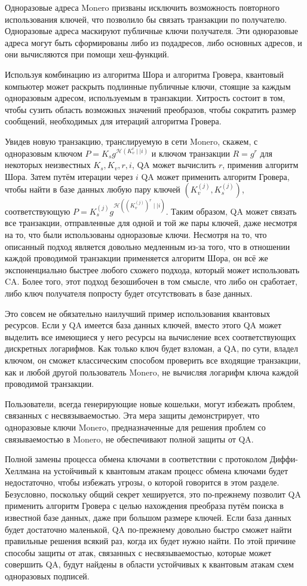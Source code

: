 \documentclass{mrl}
\begin{document}
Одноразовые адреса Monero призваны исключить возможность повторного использования ключей, что позволило бы связать транзакции по получателю. Одноразовые адреса маскируют публичные ключи получателя. Эти одноразовые адреса могут быть сформированы либо из подадресов, либо основных адресов, и они вычисляются при помощи хеш-функций.

Используя комбинацию из алгоритма Шора и алгоритма Гровера, квантовый компьютер может раскрыть подлинные публичные ключи, стоящие за каждым одноразовым адресом, используемым в транзакции. Хитрость состоит в том, чтобы сузить область возможных значений преобразов, чтобы сократить размер сообщений, необходимых для итераций алгоритма Гровера. 

Увидев новую транзакцию, транслируемую в сети Monero, скажем, с одноразовым ключом $P = K_s g^{\mathcal{H}(K_v^r \mid \mid i)}$ и ключом транзакции $R = g^r$ для некоторых неизвестных $K_s, K_v, r, i$, QA может вычислить $r$, применив алгоритм Шора. Затем путём итерации через $i$ QA может применить алгоритм Гровера, чтобы найти в базе данных любую пару ключей $(K_v^{(j)}, K_s^{(j)})$, соответствующую $P = K_s^{(j)} g^{\mathcal{H}((K_v^{(j)})^r \mid \mid i)}$. Таким образом, QA может связать все транзакции, отправленные для одной и той же пары ключей, даже несмотря на то, что были использованы одноразовые ключи. Несмотря на то, что описанный подход является довольно медленным из-за того, что в отношении каждой проводимой транзакции применяется алгоритм Шора, он всё же экспоненциально быстрее любого схожего подхода, который может использовать CA. Более того, этот подход безошибочен в том смысле, что либо он сработает, либо ключ получателя попросту будет отсутствовать в базе данных.

Это совсем не обязательно наилучший пример использования квантовых ресурсов. Если у QA имеется база данных ключей, вместо этого QA может выделить все имеющиеся у него ресурсы на вычисление всех соответствующих дискретных логарифмов. Как только ключ будет взломан, а QA, по сути, владел ключом, он сможет классическим способом проверить все входящие транзакции, как и любой другой пользователь Monero, не вычисляя логарифм ключа каждой проводимой транзакции. 

Пользователи, всегда генерирующие новые кошельки, могут избежать проблем, связанных с несвязываемостью. Эта мера защиты демонстрирует, что одноразовые ключи Monero, предназначенные для решения проблем со связываемостью в Monero, не обеспечивают полной защиты от QA.

Полной замены процесса обмена ключами в соответствии с протоколом Диффи-Хеллмана на устойчивый к квантовым атакам процесс обмена ключами будет недостаточно, чтобы избежать угрозы, о которой говорится в этом разделе. Безусловно, поскольку общий секрет хешируется, это по-прежнему позволит QA применить алгоритм Гровера с целью нахождения преобраза путём поиска в известной базе данных, даже при большом размере ключей. Если база данных будет достаточно маленькой, QA по-прежнему довольно быстро сможет найти правильные решения всякий раз, когда их будет нужно найти. По этой причине способы защиты от атак, связанных с несвязываемостью, которые может совершить QA, будут найдены в области устойчивых к квантовым атакам схем одноразовых подписей. 
\end{document}
